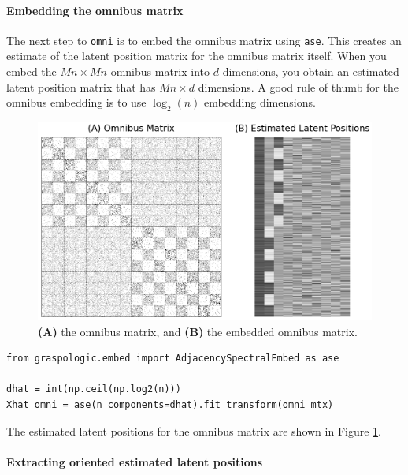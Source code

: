 \paragraph*{Embedding the omnibus matrix}

The next step to \texttt{omni} is to embed the omnibus matrix using \texttt{ase}. This creates an estimate of the latent position matrix for the omnibus matrix itself. When you embed the $Mn \times Mn$ omnibus matrix into $d$ dimensions, you obtain an estimated latent position matrix that has $Mn \times d$ dimensions. A good rule of thumb for the omnibus embedding is to use $\log_2(n)$ embedding dimensions.

\begin{figure}[h]
    \centering
    \includegraphics[width=\linewidth]{representations/ch6/Images/omni_mtx.png}
    \caption[omnibus matrix and omnibus embedding]{\textbf{(A)} the omnibus matrix, and \textbf{(B)} the embedded omnibus matrix.}
    \label{fig:ch6:multinet:omni:fullmtx}
\end{figure}

\begin{lstlisting}[style=python]
from graspologic.embed import AdjacencySpectralEmbed as ase

dhat = int(np.ceil(np.log2(n)))
Xhat_omni = ase(n_components=dhat).fit_transform(omni_mtx)
\end{lstlisting}

The estimated latent positions for the omnibus matrix are shown in Figure \ref{fig:ch6:multinet:omni:fullmtx}.

\paragraph*{Extracting oriented estimated latent positions}


